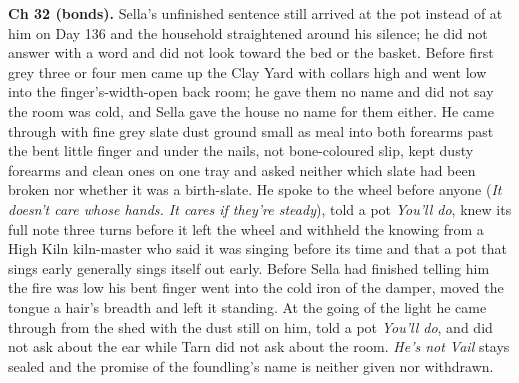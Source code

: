 \documentclass{design/chronicle}
\begin{document}
{\textbf{Ch 32 (bonds).} Sella’s unfinished sentence still arrived at the pot instead of at him on Day 136 and the household straightened around his silence; he did not answer with a word and did not look toward the bed or the basket. Before first grey three or four men came up the Clay Yard with collars high and went low into the finger’s-width-open back room; he gave them no name and did not say the room was cold, and Sella gave the house no name for them either. He came through with fine grey slate dust ground small as meal into both forearms past the bent little finger and under the nails, not bone-coloured slip, kept dusty forearms and clean ones on one tray and asked neither which slate had been broken nor whether it was a birth-slate. He spoke to the wheel before anyone (\emph{It doesn’t care whose hands. It cares if they’re steady}), told a pot \emph{You’ll do}, knew its full note three turns before it left the wheel and withheld the knowing from a High Kiln kiln-master who said it was singing before its time and that a pot that sings early generally sings itself out early. Before Sella had finished telling him the fire was low his bent finger went into the cold iron of the damper, moved the tongue a hair’s breadth and left it standing. At the going of the light he came through from the shed with the dust still on him, told a pot \emph{You’ll do}, and did not ask about the ear while Tarn did not ask about the room. \emph{He’s not Vail} stays sealed and the promise of the foundling’s name is neither given nor withdrawn.

}
\end{document}
